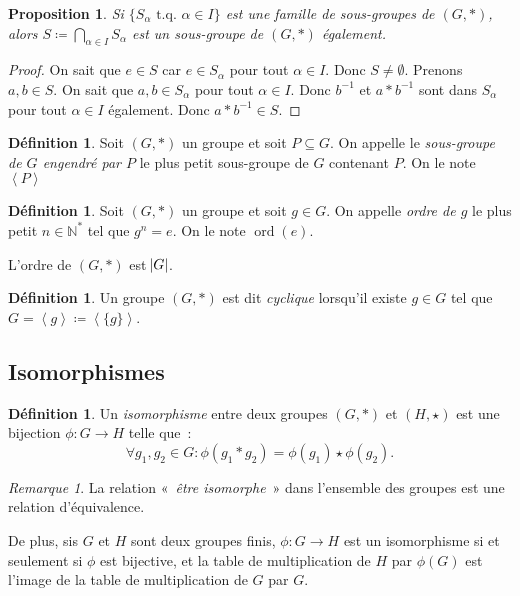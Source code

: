 \documentclass{article}
\newtheorem{prp}[thm]{Proposition}
\theoremstyle{definition}
\newtheorem{déf}[thm]{Définition}
\theoremstyle{remark}
\newtheorem*{rmq}{Remarque}
\DeclareMathOperator{\ord}{ord}
\newcommand{\N}{\mathbb N}
\newcommand{\tq}{\text{ t.q. }}
\newcommand{\eng}[1]{\left\langle#1\right\rangle}
\begin{document}
		\begin{prp}\label{prp:intersection_sous-groupes} Si $\{S_\alpha \tq \alpha \in I\}$ est une famille de sous-groupes de $(G, *)$, alors
		$S \coloneqq \bigcap_{\alpha \in I}S_\alpha$ est un sous-groupe de $(G, *)$ également.
		\end{prp}

		\begin{proof} On sait que $e \in S$ car $e \in S_\alpha$ pour tout $\alpha \in I$. Donc $S \neq \emptyset$. Prenons $a, b \in S$. On sait que
		$a, b \in S_\alpha$ pour tout $\alpha \in I$. Donc $b^{-1}$ et $a*b^{-1}$ sont dans $S_\alpha$ pour tout $\alpha \in I$ également. Donc $a*b^{-1} \in S$.
		\end{proof}

		\begin{déf} Soit $(G, *)$ un groupe et soit $P \subseteq G$. On appelle le \textit{sous-groupe de $G$ engendré par $P$} le plus petit sous-groupe de $G$
		contenant $P$. On le note $\eng P$
		\end{déf}

		\begin{déf} Soit $(G, *)$ un groupe et soit $g \in G$. On appelle \textit{ordre de $g$} le plus petit $n \in \N^*$ tel que $g^n = e$.
		On le note $\ord(e)$.

		L'ordre de $(G, *)$ est $\abs G$.
		\end{déf}

		\begin{déf} Un groupe $(G, *)$ est dit \textit{cyclique} lorsqu'il existe $g \in G$ tel que $G = \eng g \coloneqq \eng {\{g\}}$.
		\end{déf}

	\subsection{Isomorphismes}
		\begin{déf} Un \textit{isomorphisme} entre deux groupes $(G, *)$ et $(H, \star)$ est une bijection $\phi : G \to H$ telle que~:
		\[\forall g_1, g_2 \in G : \phi(g_1 * g_2) = \phi(g_1) \star \phi(g_2).\]
		\end{déf}

		\begin{rmq} La relation «~\textit{être isomorphe}~» dans l'ensemble des groupes est une relation d'équivalence.

		De plus, sis $G$ et $H$ sont deux groupes finis, $\phi : G \to H$ est un isomorphisme si et seulement si $\phi$ est bijective, et la table de
		multiplication de $H$ par $\phi(G)$ est l'image de la table de multiplication de $G$ par $G$.
		\end{rmq}
\end{document}
